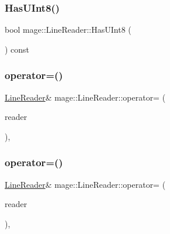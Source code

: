 \hypertarget{classmage_1_1_line_reader_a7d9359c8a65005358564728be9091fa8}{}\label{classmage_1_1_line_reader_a7d9359c8a65005358564728be9091fa8} 
\subsubsection{\texorpdfstring{Has\+U\+Int8()}{HasUInt8()}}
{\footnotesize\ttfamily bool mage\+::\+Line\+Reader\+::\+Has\+U\+Int8 (\begin{DoxyParamCaption}{ }\end{DoxyParamCaption}) const\hspace{0.3cm}{\ttfamily [protected]}}

\hypertarget{classmage_1_1_line_reader_a2247078d0b5602f9a9a6b74019832faf}{}\label{classmage_1_1_line_reader_a2247078d0b5602f9a9a6b74019832faf} 
\subsubsection{\texorpdfstring{operator=()}{operator=()}\hspace{0.1cm}{\footnotesize\ttfamily [1/2]}}
{\footnotesize\ttfamily \hyperlink{classmage_1_1_line_reader}{Line\+Reader}\& mage\+::\+Line\+Reader\+::operator= (\begin{DoxyParamCaption}\item[{const \hyperlink{classmage_1_1_line_reader}{Line\+Reader} \&}]{reader }\end{DoxyParamCaption})\hspace{0.3cm}{\ttfamily [private]}, {\ttfamily [delete]}}

\hypertarget{classmage_1_1_line_reader_a45504c0ba4238eedf851cfb9df081a01}{}\label{classmage_1_1_line_reader_a45504c0ba4238eedf851cfb9df081a01} 
\subsubsection{\texorpdfstring{operator=()}{operator=()}\hspace{0.1cm}{\footnotesize\ttfamily [2/2]}}
{\footnotesize\ttfamily \hyperlink{classmage_1_1_line_reader}{Line\+Reader}\& mage\+::\+Line\+Reader\+::operator= (\begin{DoxyParamCaption}\item[{\hyperlink{classmage_1_1_line_reader}{Line\+Reader} \&\&}]{reader }\end{DoxyParamCaption})\hspace{0.3cm}{\ttfamily [private]}, {\ttfamily [delete]}}

